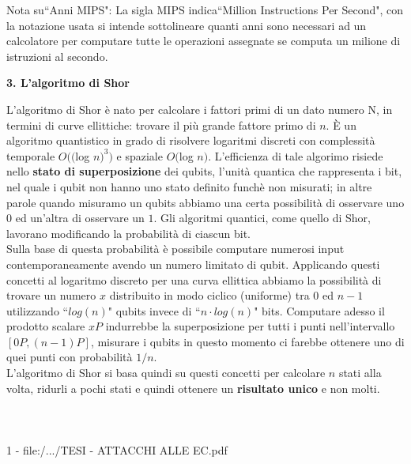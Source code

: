 \documentclass[a4paper,12pt]{tesiinfo}
\begin{document}
Nota su``Anni MIPS": La sigla MIPS indica``Million Instructions Per Second", con la notazione usata si intende sottolineare quanti anni sono necessari ad un calcolatore per computare tutte le operazioni assegnate se computa un milione di istruzioni al secondo.
\begin{center}
  \textbf{3. L'algoritmo di Shor}
\end{center}
L'algoritmo di Shor \`e nato per calcolare i fattori primi di un dato numero N, in termini di curve ellittiche: trovare il pi\`u grande fattore primo di $n$. \`E un algoritmo quantistico in grado di risolvere logaritmi discreti con complessit\`a temporale $O(($log $n)^3)$ e spaziale $O($log $n)$. L'efficienza di tale algorimo risiede nello \textbf{stato di superposizione} dei qubits, l'unit\`a quantica che rappresenta i bit, nel quale i qubit non hanno uno stato definito funch\`e non misurati; in altre parole quando misuramo un qubits abbiamo una certa possibilit\`a di osservare uno $0$ ed un'altra di osservare un $1$. Gli algoritmi quantici, come quello di Shor, lavorano modificando la probabilit\`a di ciascun bit.
\\
Sulla base di questa probabilit\`a \`e possibile computare numerosi input contemporaneamente avendo un numero limitato di qubit. Applicando questi concetti al logaritmo discreto per una curva ellittica abbiamo la possibilit\`a di trovare un numero $x$ distribuito in modo ciclico (uniforme) tra $0$ ed $n-1$ utilizzando ``$log(n)$" qubits invece di ``$n \cdot log(n)$" bits. Computare adesso il prodotto scalare $xP$ indurrebbe la superposizione per tutti i punti nell'intervallo $[0P, (n-1)P]$, misurare i qubits in questo momento ci farebbe ottenere uno di quei punti con probabilit\`a $1 \big / n$.
\\
L'algoritmo di Shor si basa quindi su questi concetti per calcolare $n$ stati alla volta, ridurli a pochi stati e quindi ottenere un \textbf{risultato unico} e non molti.
%
%
\\
\\
\\
\\1 - file:/.../TESI - ATTACCHI ALLE EC.pdf
%
%
%
%
%
%
%
%
\end{document}
